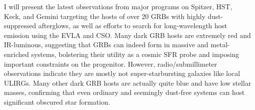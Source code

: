 


\bigskip



\bigskip

\noindent I will present the latest observations from major programs on Spitzer, HST, Keck, and Gemini targeting the hosts of over 20 GRBs with highly dust-suppressed afterglows, as well as efforts to search for long-wavelength host emission using the EVLA and CSO.  Many dark GRB hosts are extremely red and IR-luminous, suggesting that GRBs can indeed form in massive and metal-enriched systems, bolstering their utility as a cosmic SFR probe and imposing important constraints on the progenitor.  However, radio/submillimeter observations indicate they are mostly not super-starbursting galaxies like local ULIRGs.  Many other dark GRB hosts are actually quite blue and have low stellar masses, confirming that even ordinary and seemingly dust-free systems can host significant obscured star formation.
